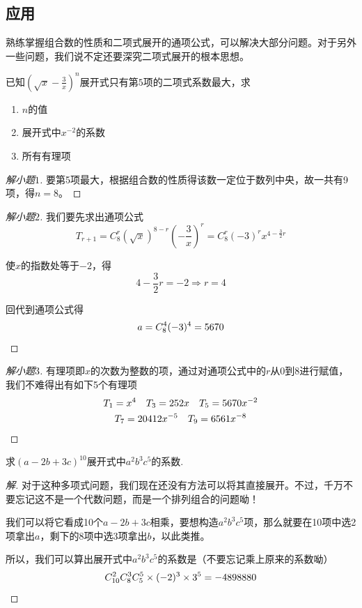 \subsection{应用}
熟练掌握组合数的性质和二项式展开的通项公式，可以解决大部分问题。对于另外一些问题，我们说不定还要深究二项式展开的根本思想。

\begin{example}
	已知$(\sqrt{x}-\frac{3}{x})^n$展开式只有第$5$项的二项式系数最大，求

	\begin{enumerate}
		\item $n$的值
		\item 展开式中$x^{-2}$的系数
		\item 所有有理项
	\end{enumerate}
\end{example}

\begin{proof}[解小题$1$]
	要第5项最大，根据组合数的性质得该数一定位于数列中央，故一共有9项，得$n=8$。
\end{proof}

\begin{proof}[解小题$2$]
	我们要先求出通项公式\[T_{r+1}=C_8^r(\sqrt{x})^{8-r}(-\frac{3}{x})^r=C_8^r(-3)^rx^{4-\frac{3}{2}r}\]

	使$x$的指数处等于$-2$，得\[4-\frac{3}{2}r=-2\Rightarrow r=4\]

	回代到通项公式得\[a=C_8^4(-3)^4=5670\qedhere\]
\end{proof}

\begin{proof}[解小题$3$]
	有理项即$x$的次数为整数的项，通过对通项公式中的$r$从0到8进行赋值，我们不难得出有如下5个有理项
	\begin{gather*}
		T_1=x^4\quad T_3=252x\quad T_5=5670x^{-2} \\
		T_7=20412x^{-5}\quad T_9=6561x^{-8} \qedhere
	\end{gather*}
\end{proof}

\begin{example}
	求$(a-2b+3c)^{10}$展开式中$a^2b^3c^5$的系数.
\end{example}

\begin{proof}[解]
	对于这种多项式问题，我们现在还没有方法可以将其直接展开。不过，千万不要忘记这不是一个代数问题，而是一个排列组合的问题呦！

	我们可以将它看成10个$a-2b+3c$相乘，要想构造$a^2b^3c^5$项，那么就要在10项中选2项拿出$a$，剩下的8项中选3项拿出$b$，以此类推。

	所以，我们可以算出展开式中$a^2b^3c^5$的系数是（不要忘记乘上原来的系数呦）\[C_{10}^2C_8^3C_5^5\times(-2)^3\times3^5=-4898880 \qedhere\]
\end{proof}

